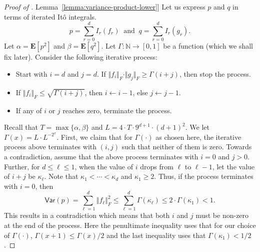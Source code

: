 \documentclass[11pt]{article}
\numberwithin{equation}{section}
\theoremstyle{definition}
\theoremstyle{plain}
\newcommand{\expref}[2]{\hyperref[#2]{#1~\ref{#2}}}
\begin{document}
\begin{proof}[Proof of \expref{Lemma}{lemma:variance-product-lower}]
    Let us express $p$ and $q$ in terms of iterated It\^{o} integrals. 
\[
p = \sum_{r=0}^{d} I_r(f_r) \ \textrm{ and } \ q = \sum_{r=0}^{d} I_r(g_r).
\]
Let $\alpha = \mathbf{E}[p^2]$ and $\beta= \mathbf{E}[q^2]$. 
Let $\Gamma : \mathbb{N} \rightarrow [0,1]$ be a function (which we shall fix later). Consider the following iterative process:
\begin{itemize}
\item Start with $i=d$ and $j=d$. If $\Vert f_i \Vert_F \cdot \Vert g_j \Vert_F \ge \Gamma(i+j)$, then stop the process. 
\item If $\Vert f_i \Vert_F \le \sqrt{\Gamma(i+j)}$, then $i \leftarrow i-1$, else $j \leftarrow  j-1$. 
\item If any of $i$ or $j$ reaches zero, terminate the process. 
\end{itemize}
Recall that  $T = \max \{\alpha, \beta\} $ and $L = 4 \cdot T \cdot 9^{d+1} \cdot (d+1)^2$. We let $\Gamma (x) = L \cdot L^{-2^{x}}$. First, we claim that for $\Gamma(\cdot)$ as chosen here, the iterative process above terminates with $(i,j)$ such that neither of them is zero. Towards a contradiction, assume that the above process terminates with $i=0$ and $j>0$. Further, for $d \le \ell \le 1$, when the value of $i$ drops from $\ell$ to $\ell-1$, let the value of $i+j$ be $\kappa_\ell$. Note that $\kappa_1 < \cdots < \kappa_d$ and $\kappa_1 \ge 2$.  Thus, if the process terminates with $i=0$, 
then 
\[
\mathsf{Var}(p)= \sum_{\ell=1}^d \Vert f_\ell \Vert_F^2  \le \sum_{\ell=1}^d  \Gamma(\kappa_\ell) \le 2 \cdot \Gamma(\kappa_1)  <1.
\]
This results in a contradiction which means that both $i$ and $j$ must be non-zero at the end of the process.  Here the penultimate inequality uses that for our choice of $\Gamma(\cdot)$, $\Gamma(x+1) \le \Gamma(x)/2$ and the last inequality uses that $\Gamma(\kappa_1) <1/2$. 


\end{proof}
\end{document}
